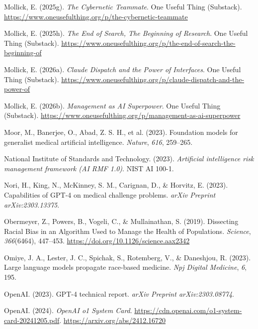 \documentclass[
  letterpaper,
  11pt]{scrbook}
\newlength{\cslhangindent}
\newenvironment{CSLReferences}[2] %
 {\begin{list}{}{%
  \setlength{\itemindent}{0pt}
  \setlength{\leftmargin}{0pt}
  \setlength{\parsep}{0pt}
  \ifodd #1
   \setlength{\leftmargin}{\cslhangindent}
   \setlength{\itemindent}{-1\cslhangindent}
  \fi
  \setlength{\itemsep}{#2\baselineskip}}}
 {\end{list}}
\begin{document}
\begin{CSLReferences}{1}{0}
Mollick, E. (2025g). \emph{{The Cybernetic Teammate}}. One Useful Thing
(Substack).
\url{https://www.oneusefulthing.org/p/the-cybernetic-teammate}

Mollick, E. (2025h). \emph{{The End of Search, The Beginning of
Research}}. One Useful Thing (Substack).
\url{https://www.oneusefulthing.org/p/the-end-of-search-the-beginning-of}

Mollick, E. (2026a). \emph{{Claude Dispatch and the Power of
Interfaces}}. One Useful Thing (Substack).
\url{https://www.oneusefulthing.org/p/claude-dispatch-and-the-power-of}

Mollick, E. (2026b). \emph{{Management as AI Superpower}}. One Useful
Thing (Substack).
\url{https://www.oneusefulthing.org/p/management-as-ai-superpower}

{Moor, M., Banerjee, O., Abad, Z. S. H., et al.} (2023). Foundation
models for generalist medical artificial intelligence. \emph{Nature},
\emph{616}, 259--265.

National Institute of Standards and Technology. (2023). \emph{Artificial
intelligence risk management framework ({AI RMF 1.0})}. NIST AI 100-1.

Nori, H., King, N., McKinney, S. M., Carignan, D., \& Horvitz, E.
(2023). Capabilities of {GPT-4} on medical challenge problems.
\emph{arXiv Preprint arXiv:2303.13375}.

Obermeyer, Z., Powers, B., Vogeli, C., \& Mullainathan, S. (2019).
{Dissecting Racial Bias in an Algorithm Used to Manage the Health of
Populations}. \emph{Science}, \emph{366}(6464), 447--453.
\url{https://doi.org/10.1126/science.aax2342}

Omiye, J. A., Lester, J. C., Spichak, S., Rotemberg, V., \& Daneshjou,
R. (2023). Large language models propagate race-based medicine.
\emph{Npj Digital Medicine}, \emph{6}, 195.

OpenAI. (2023). {GPT-4} technical report. \emph{arXiv Preprint
arXiv:2303.08774}.

OpenAI. (2024). \emph{{OpenAI o1 System Card}}.
\url{https://cdn.openai.com/o1-system-card-20241205.pdf}.
\url{https://arxiv.org/abs/2412.16720}


\end{CSLReferences}
\end{document}
